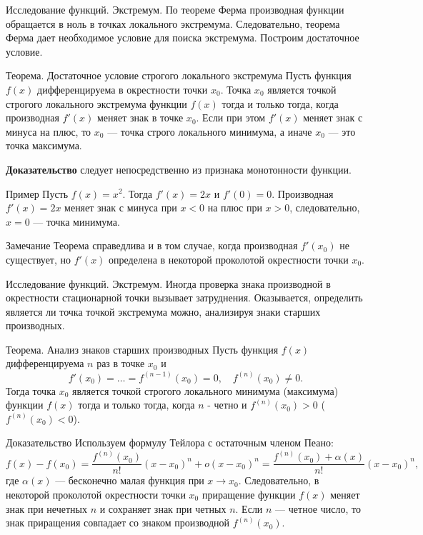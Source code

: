 \documentclass[8pt]{beamer}
\begin{document}
\begin{frame}{Исследование функций. Экстремум.}
По теореме Ферма производная функции обращается в ноль в точках локального экстремума. Следовательно, теорема Ферма дает необходимое условие для поиска экстремума. Построим достаточное условие.
\begin{block}{Теорема. Достаточное условие строгого локального экстремума}
Пусть функция $f(x)$ дифференцируема в окрестности точки $x_0$.
Точка $x_0$ является точкой строгого локального экстремума функции $f(x)$ тогда и только тогда, когда производная $f'(x)$ меняет знак в точке $x_0$. Если при этом $f'(x)$ меняет знак с минуса на плюс, то $x_0$ --- точка строго локального минимума, а иначе $x_0$ --- это точка максимума.
\end{block}
{\bf Доказательство} следует непосредственно из признака монотонности функции.
\begin{block}{Пример}
Пусть $f(x)=x^2$. Тогда $f'(x) = 2x$ и $f'(0) = 0$. Производная $f'(x)=2x$ меняет знак с минуса при $x<0$ на плюс при $x>0$, следовательно, $x=0$ --- точка минимума.
\end{block}
\begin{block}{Замечание}
Теорема справедлива и в том случае, когда производная $f'(x_0)$ не существует, но $f'(x)$ определена в некоторой проколотой окрестности точки $x_0$.
\end{block}
\end{frame}

\begin{frame}{Исследование функций. Экстремум.}
Иногда проверка знака производной в окрестности стационарной точки вызывает затруднения. Оказывается, определить является ли точка точкой экстремума можно, анализируя знаки старших производных.

\begin{block}{Теорема. Анализ знаков старших производных}
Пусть функция $f(x)$ дифференцируема $n$ раз в точке $x_0$ и
$$f'(x_0) = \ldots = f^{(n-1)}(x_0)=0,\quad f^{(n)}(x_0)\ne 0.$$
Тогда точка $x_0$ является точкой строгого локального минимума (максимума) функции $f(x)$ тогда и только тогда, когда $n$ - четно и $f^{(n)}(x_0)>0$ ($f^{(n)}(x_0)<0$).
\end{block}

\begin{block}{Доказательство}
Используем формулу Тейлора с остаточным членом Пеано:
$$f(x) - f(x_0) =\frac{ f^{(n)}(x_0)}{n!} (x-x_0)^n+o(x-x_0)^n = \frac{ f^{(n)}(x_0)+\alpha(x)}{n!} (x-x_0)^n,$$
где $\alpha(x)$ --- бесконечно малая функция при $x\to x_0$.
Следовательно, в некоторой проколотой окрестности точки $x_0$ приращение функции $f(x)$ меняет знак при нечетных $n$ и сохраняет знак при четных $n$. Если $n$ --- четное число, то знак приращения совпадает со знаком производной $f^{(n)}(x_0)$.
\end{block}
\end{frame}
\end{document}
